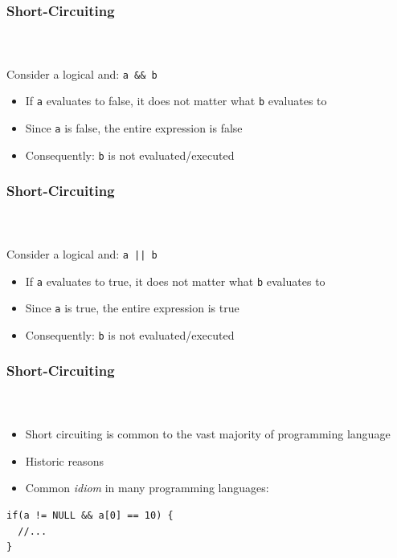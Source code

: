 \documentclass[]{beamer}
\begin{document}
\begin{frame}[fragile]
  \frametitle{Short-Circuiting}
  \framesubtitle{~}

Consider a logical and: \texttt{a && b}

\begin{itemize}[<+->]
  \item If \texttt{a} evaluates to false, it does not matter 
  what \texttt{b} evaluates to
  \item Since \texttt{a} is false, the entire expression is false
  \item Consequently: \texttt{b} is not evaluated/executed
\end{itemize}

\end{frame}

\begin{frame}[fragile]
  \frametitle{Short-Circuiting}
  \framesubtitle{~}

Consider a logical and: \texttt{a || b}    
\begin{itemize}[<+->]
  \item If \texttt{a} evaluates to true, it does not matter 
  what \texttt{b} evaluates to
  \item Since \texttt{a} is true, the entire expression is true
  \item Consequently: \texttt{b} is not evaluated/executed
\end{itemize}

\end{frame}

\begin{frame}[fragile]
  \frametitle{Short-Circuiting}
  \framesubtitle{~}

\begin{itemize}[<+->]
  \item Short circuiting is common to the vast majority of programming language
  \item Historic reasons
  \item Common \emph{idiom} in many programming languages:
\end{itemize}

\begin{overprint}
\begin{verbatim}
if(a != NULL && a[0] == 10) {
  //...
}
\end{verbatim}
\end{overprint}

\end{frame}
\end{document}
